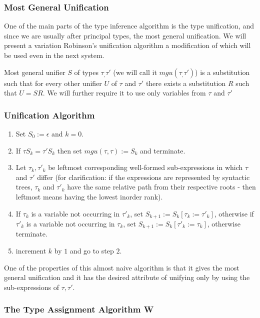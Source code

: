 \subsubsection{Most General Unification}

One of the main parts of the type inference algorithm is the type unification, and since we are usually after principal types, the most general unification.
We will present a variation Robinson's unification algorithm a modification of which will be used even in the next system.

Most general unifier $S$ of types $\tau_, \tau'$ (we will call it $mgu (\tau_, \tau')$) is a substitution such that for every other unifier $U$ of $\tau$ and $\tau'$ there exists a substitution $R$ such that $U = S R$. %
We will further require it to use only variables from $\tau$ and $\tau'$

\subsubsection{Unification Algorithm}

\begin{enumerate}
    \item Set $S_0 := \epsilon$ and $k = 0$.
    \item If $\tau S_k = \tau' S_k$ then set $mgu(\tau,\tau) := S_k$ and terminate.
    \item Let $\tau_k, \tau'_k$ be leftmost corresponding well-formed sub-expressions in which $\tau$ and $\tau'$ differ (for clarification: if the expressions are represented by syntactic trees, $\tau_k$ and $\tau'_k$ have the same relative path from their respective roots - then leftmost means having the lowest inorder rank).
    \item If $\tau_k$ is a variable not occurring in $\tau'_k$, set $S_{k+1} := S_k [\tau_k := \tau'_k]$, otherwise if $\tau'_k$ is a variable not occurring in $\tau_k$, set $S_{k+1} := S_k [\tau'_k := \tau_k]$, otherwise terminate.
    \item increment $k$ by $1$ and go to step $2$.
\end{enumerate}

One of the properties of this almost naive algorithm is that it gives the most general unification and it has the desired attribute of unifying only by using the sub-expressions of $\tau, \tau'$.

\subsubsection{The Type Assignment Algorithm W}

